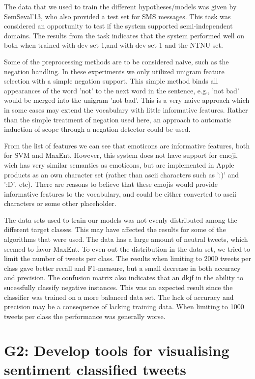 The data that we used to train the different hypotheses/models was given by SemSeval'13, who also provided a test set for SMS messages. This task was considered an opportunity to test if the system supported semi-independent domains. The results from the task indicates that the system performed well on both when trained with dev set 1,and with dev set 1 and the NTNU set.

Some of the preprocessing methods are to be considered naive, such as the negation handling. In these experiments we only utilized unigram feature selection with a simple negation support. This simple method binds all appearances of the word 'not' to the next word in the sentence, e.g., 'not bad' would be merged into the unigram 'not-bad'. This is a very naive approach which in some cases may extend the vocabulary with little informative features. Rather than the simple treatment of negation used here, an approach to automatic induction of scope through a negation detector\citep{CouncillEA:10} could be used.

From the list of features we can see that emoticons are informative features, both for SVM and MaxEnt. However, this system does not have support for emoji, wich has very similar semantics as emoticons, but are implemented in Apple products as an own character set (rather than ascii characters such as ':)' and ':D', etc). There are reasons to believe that these emojis would provide informative features to the vocabulary, and could be either converted to ascii characters or some other placeholder.

The data sets used to train our models was not evenly distributed among the different target classes. This may have affected the results for some of the algorithms that were used. The data has a large amount of neutral tweets, which seemed to favor MaxEnt. To even out the distribution in the data set, we tried to limit the number of tweets per class. The results when limiting to 2000 tweets per class gave better recall and F1-measure, but a small decrease in both accuracy and precision. The confusion matrix also indicates that an dkjf in the ability to sucessfully classify negative instances. This was an expected result since the classifier was trained on a more balanced data set. The lack of accuracy and precision may be a consequence of lacking training data. When limiting to 1000 tweets per class the performance was generally worse.



\section{G2: Develop tools for visualising sentiment classified tweets}

